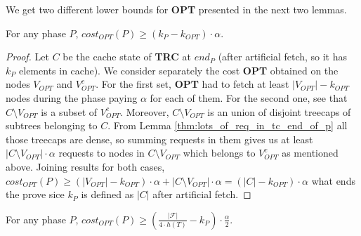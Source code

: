 We get two different lower bounds for \textbf{OPT} presented in the next two 
lemmas. 
\begin{lemma}
For any phase $P$, $cost_{OPT}(P) \geq (k_P - k_{OPT}) \cdot \alpha$. 
\end{lemma}
\begin{proof}
Let $C$ be the cache state of \textbf{TRC} at $end_P$ (after artificial fetch, 
so it has $k_P$ elements in cache). We consider separately the cost 
\textbf{OPT} obtained on the nodes $V_{OPT}$ and $V_{OPT}^c$. For the first 
set, \textbf{OPT} had to fetch at least $|V_{OPT}| - k_{OPT}$ nodes during the 
phase paying $\alpha$ for each of them. For the second one, see that 
$C \setminus V_{OPT}$ is a subset of $V_{OPT}^c$. Moreover, $C \setminus 
V_{OPT}$ is an union of disjoint treecaps of subtrees belonging to $C$. From 
Lemma \ref{thm:lots_of_req_in_tc_end_of_p} all those treecaps are dense, so 
summing requests in them gives us at least $|C \setminus V_{OPT}| \cdot 
\alpha$ requests to nodes in $C \setminus V_{OPT}$ which belongs to $V_{OPT}^c$ 
as mentioned above. Joining results for both cases, $cost_{OPT}(P) \geq 
(|V_{OPT}| - k_{OPT}) \cdot \alpha + |C \setminus V_{OPT}| \cdot 
\alpha = (|C| - k_{OPT}) \cdot \alpha$ what ends the prove sice $k_P$ is 
defined as $|C|$ after artificial fetch. 
\end{proof}
\begin{lemma}
For any phase $P$, $cost_{OPT}(P) \geq (\frac{|\mathcal{F}|}{4 \cdot h(T)} 
-k_P) \cdot \frac{\alpha}{2}$. 
\end{lemma}
